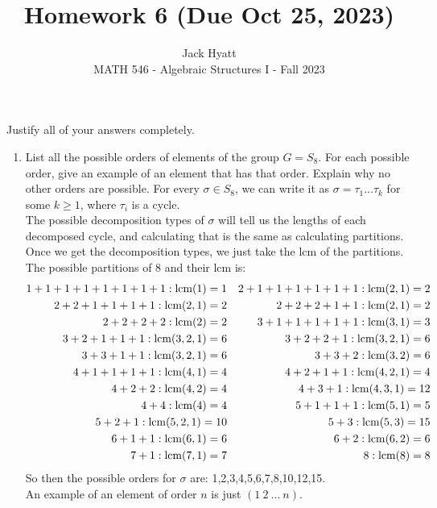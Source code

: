 \documentclass[12pt]{article}
\begin{document}
	
	
	
	\title{Homework 6 (Due Oct 25, 2023)}
	\author{Jack Hyatt\\ %
		MATH 546 - Algebraic Structures I - Fall 2023} 
	
	\maketitle
	
	Justify all of your answers completely.\\

	
	\medskip 
	
	\begin{enumerate}
		\item List all the possible orders of elements of the group $G = S_8$. For each possible order, give an example of an element that has that order. Explain why no other orders are possible.\m
		For every $\sigma \in S_8$, we can write it as $\sigma = \tau_1\ldots\tau_k$ for some $k\geq1$, where $\tau_i$ is a cycle.\\
		The possible decomposition types of $\sigma$ will tell us the lengths of each decomposed cycle, and calculating that is the same as calculating partitions. Once we get the decomposition types, we just take the lcm of the partitions.\\
		The possible partitions of 8 and their lcm is:
		\begin{align*}
			1+1+1+1+1+1+1+1 : \operatorname{lcm}(1) = 1 && 2+1+1+1+1+1+1 : \operatorname{lcm}(2,1) = 2\\
			2+2+1+1+1+1 : \operatorname{lcm}(2,1) = 2 && 2+2+2+1+1 : \operatorname{lcm}(2,1) = 2\\
			2+2+2+2 : \operatorname{lcm}(2) = 2 && 3+1+1+1+1+1 : \operatorname{lcm}(3,1) = 3\\
			3+2+1+1+1 : \operatorname{lcm}(3,2,1) = 6 && 3+2+2+1 : \operatorname{lcm}(3,2,1) = 6\\
			3+3+1+1 : \operatorname{lcm}(3,2,1) = 6 && 3+3+2 : \operatorname{lcm}(3,2) = 6\\
			4+1+1+1+1 : \operatorname{lcm}(4,1) = 4 && 4+2+1+1 : \operatorname{lcm}(4,2,1) = 4\\
			4+2+2 : \operatorname{lcm}(4,2) = 4 && 4+3+1 : \operatorname{lcm}(4,3,1) = 12\\
			4+4 : \operatorname{lcm}(4) = 4 && 5+1+1+1 : \operatorname{lcm}(5,1) = 5\\
			5+2+1 : \operatorname{lcm}(5,2,1) = 10 && 5+3 : \operatorname{lcm}(5,3) = 15\\
			6+1+1 : \operatorname{lcm}(6,1) = 6 && 6+2 : \operatorname{lcm}(6,2) = 6\\
			7+1 : \operatorname{lcm}(7,1) = 7 && 8 : \operatorname{lcm}(8) = 8\\
		\end{align*}
		So then the possible orders for $\sigma$ are: 1,2,3,4,5,6,7,8,10,12,15.\\
		An example of an element of order $n$ is just $(1\ 2\ \ldots\ n)$.
		

\end{enumerate}
\end{document}
